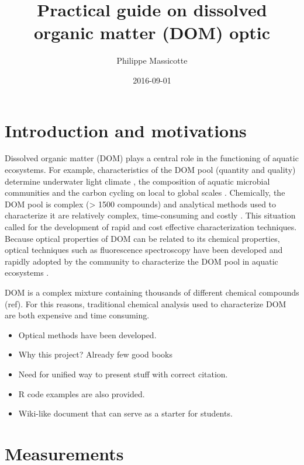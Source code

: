 \documentclass[]{book}
\title{Practical guide on dissolved organic matter (DOM) optic}
\author{Philippe Massicotte}
\date{2016-09-01}
\providecommand{\tightlist}{%
  \setlength{\itemsep}{0pt}\setlength{\parskip}{0pt}}
\begin{document}
\maketitle

{
\setcounter{tocdepth}{1}
\tableofcontents
}
\chapter{Introduction and
motivations}\label{introduction-and-motivations}

Dissolved organic matter (DOM) plays a central role in the functioning
of aquatic ecosystems. For example, characteristics of the DOM pool
(quantity and quality) determine underwater light climate
\citep{Kirk1994}, the composition of aquatic microbial communities
\citep{Foreman2003, Kritzberg2006a} and the carbon cycling on local to
global scales \citep{Cole2007}. Chemically, the DOM pool is complex
(\textgreater{} 1500 compounds) and analytical methods used to
characterize it are relatively complex, time-consuming and costly
\citep{Benner2002, Seitzinger2005, Fellman2010}. This situation called
for the development of rapid and cost effective characterization
techniques. Because optical properties of DOM can be related to its
chemical properties, optical techniques such as fluorescence
spectroscopy have been developed and rapidly adopted by the community to
characterize the DOM pool in aquatic ecosystems
\citep{Coble1990, Coble1996, McKnight2001}.

DOM is a complex mixture containing thousands of different chemical
compounds (ref). For this reasons, traditional chemical analysis used to
characterize DOM are both expensive and time consuming.

\begin{itemize}
\tightlist
\item
  Optical methods have been developed.
\item
  Why this project? Already few good books \citep{Lakowicz2006}
\item
  Need for unified way to present stuff with correct citation.
\item
  R code examples are also provided.
\item
  Wiki-like document that can serve as a starter for students.
\end{itemize}

\chapter{Measurements}\label{measurements}
\end{document}
